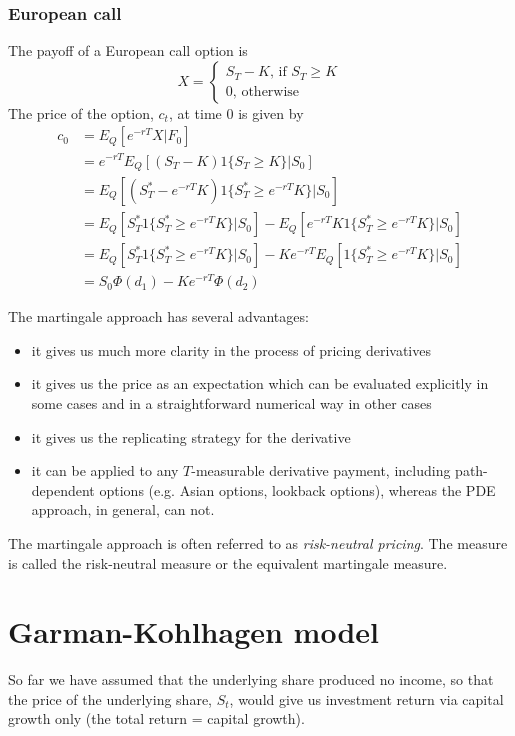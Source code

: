 \documentclass[11pt,a4paper]{book}
\theoremstyle{definition}\newtheorem{definition}{Definition}
\theoremstyle{definition}\newtheorem{fact}{Fact}
\theoremstyle{definition}\newtheorem{remark}{Remark}
\theoremstyle{definition}\newtheorem{ex}{Ex.}
\theoremstyle{definition}\newtheorem{project}{Project}
\theoremstyle{definition}\newtheorem{problem}{Problem}
\theoremstyle{definition}\newtheorem{example}{Example}
\numberwithin{theorem}{section}
\numberwithin{corollary}{chapter}
\numberwithin{assumption}{chapter}
\numberwithin{definition}{chapter}
\numberwithin{prop}{chapter}
\numberwithin{notation}{chapter}
\numberwithin{problem}{chapter}
\numberwithin{example}{chapter}
\numberwithin{fact}{chapter}
\numberwithin{ex}{chapter}
\begin{document}
\subsubsection*{European call}

The payoff of a European call option is
$$ X = \begin{cases}
S_T-K \text{,          if } S_T \geq K \\
0 \text{,          otherwise}
\end{cases} $$
The price of the option, $c_t$, at time 0 is given by
\begin{align*}
c_0 &= E_Q[e^{-rT}X|F_0] \\
&= e^{-rT} E_Q[(S_T-K) 1{\{S_T \geq K \}} | S_0] \\
&= E_Q[(S_T^* - e^{-rT}K) 1{\{S_T^* \geq e^{-rT} K \}} | S_0] \\
&= E_Q[S_T^* 1{\{S_T^* \geq e^{-rT} K \}} | S_0] - E_Q[e^{-rT}K 1{\{S_T^* \geq e^{-rT} K \}} | S_0] \\
&= E_Q[S_T^* 1{\{S_T^* \geq e^{-rT} K \}} | S_0] - Ke^{-rT} E_Q[1{\{S_T^* \geq e^{-rT} K \}} | S_0] \\
&= S_0 \Phi(d_1) - Ke^{-rT} \Phi(d_2)
\end{align*}

The martingale approach has several advantages:
\begin{itemize}
\item it gives us much more clarity in the process of pricing derivatives
\item it gives us the price as an expectation which can be evaluated explicitly in some cases and in a straightforward numerical way in other cases
\item it gives us the replicating strategy for the derivative
\item it can be applied to any $T$-measurable derivative payment, including path-dependent options (e.g. Asian options, lookback options), whereas the PDE approach, in general, can not.
\end{itemize}

The martingale approach is often referred to as \textit{risk-neutral pricing}. The measure is called the risk-neutral measure or the equivalent martingale measure.

\section{Garman-Kohlhagen model}

So far we have assumed that the underlying share produced no income, so that the price of the underlying share, $S_t$, would give us investment return via capital growth only (the total return = capital growth).
\end{document}
